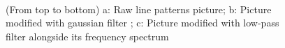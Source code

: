 \documentclass[a4paper]{article}
\begin{document}
\begin{figure}[!hbt]
  \centering
  \quad
  \\
  \quad
	\caption{ (From top to bottom) a: Raw line patterns picture; b: Picture modified with gaussian filter  ; c: Picture modified with low-pass filter alongside its frequency spectrum}
  \label{fig:ex_two}
\end{figure}
\end{document}
